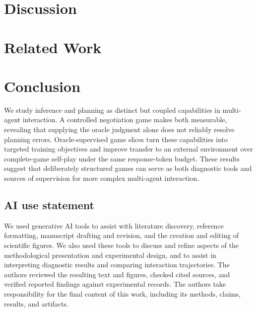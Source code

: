 \documentclass{article} %
\begin{document}
\section{Discussion}


\section{Related Work}


\section{Conclusion}

We study inference and planning as distinct but coupled capabilities in
multi-agent interaction. A controlled negotiation game makes both measurable,
revealing that supplying the oracle judgment alone does not reliably resolve
planning errors. Oracle-supervised game slices turn these capabilities into targeted
training objectives and improve transfer to an external environment over
complete-game self-play under the same response-token budget. These results
suggest that deliberately structured games can serve as both diagnostic tools
and sources of supervision for more complex multi-agent interaction.

\clearpage
\subsection*{AI use statement}

We used generative AI tools to assist with literature discovery, reference
formatting, manuscript drafting and revision, and the creation and editing of
scientific figures. We also used these tools to discuss and refine aspects of
the methodological presentation and experimental design, and to assist in
interpreting diagnostic results and comparing interaction trajectories. The
authors reviewed the resulting text and figures, checked cited sources, and
verified reported findings against experimental records. The authors take
responsibility for the final content of this work, including its methods,
claims, results, and artifacts.




\clearpage
\appendix




\end{document}
